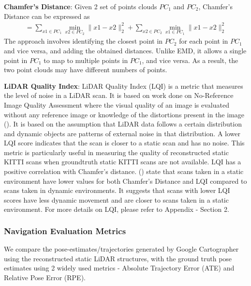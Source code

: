 \textbf{Chamfer's Distance}: Given 2 set of points clouds $PC_1$ and $PC_2$, Chamfer's Distance can be expressed as 
        \begin{equation}
            \begin{split}
          =\sum_{x1 \in PC_{1}} \min _{x2 \in PC_{2}}\|x1-x2\|_{2}^{2}+\sum_{x2 \in PC_{2}} \min _{x1 \in PC_{1}}\|x1-x2\|_{2}^{2}
          \end{split}
        \end{equation}
    The approach involves identifying the closest point in $PC_2$ for each point in $PC_1$ and vice versa, and adding the obtained distances. Unlike EMD,  it allows a single point in $PC_1$ to map to multiple points in $PC_1$, and vice versa. As a result, the two point clouds may have different numbers of points.



\textbf{LiDAR Quality Index}:
LiDAR Quality Index (LQI) is a metric that measures the level of noise in a LiDAR scan. It is based on  work done on No-Reference Image Quality Assessment where the visual quality of an image is evaluated without any reference image or knowledge of the distortions present in the image (\citet{kang2014convolutional}).  It is based on the assumption that LiDAR data follows a certain distribution and dynamic objects are patterns of external noise in that distribution. A lower LQI score indicates that the scan is closer to a static scan and has no noise. This metric is particularly useful in measuring the quality of reconstructed static KITTI scans when groundtruth static KITTI scans are not available. LQI has a positive correlation with Chamfer's distance.
 (\citet{kumar2021dynamic}) state that scans taken in a static environment have lower values for both Chamfer's Distance and LQI compared to scans taken in dynamic environments. It suggests that scans with lower LQI scores have less dynamic movement and are closer to scans taken in a static environment. For more details on LQI, please refer to Appendix - Section 2.


\subsubsection{Navigation Evaluation Metrics}
We compare the pose-estimates/trajectories generated by Google Cartographer using the reconstructed static LiDAR structures, with the ground truth pose estimates using 2 widely used metrics - Absolute Trajectory Error (ATE)  and Relative Pose Error (RPE).


